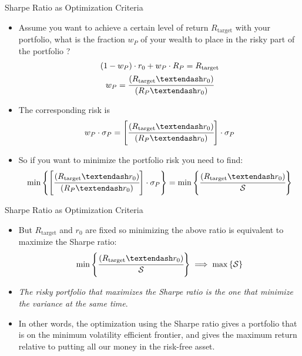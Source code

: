 \documentclass{beamer}
\begin{document}
\begin{frame}{Sharpe Ratio as Optimization Criteria}
  \begin{itemize}
    \item Assume you want to achieve a certain level of return $R_{\textrm{target}}$ with your portfolio, what is the fraction $w_P$ of your wealth to place in the risky part of the portfolio ?
      \begin{equation*}
        \begin{gathered}
          ( 1 - w_P ) \cdot r_0 + w_P \cdot R_P = R_{\textrm{target}}\\
          w_P = \cfrac{( R_{\textrm{target}} – r_0)}{( R_P – r_0)}
        \end{gathered}
      \end{equation*}
    \item The corresponding risk is
      \begin{equation*}
        w_P\cdot \sigma_P = \left[\cfrac{( R_{\textrm{target}} – r_0)}{(R_P – r_0)}\right]\cdot \sigma_P
      \end{equation*}
    \item So if you want to minimize the portfolio risk you need to find:
      \begin{equation*}
        \min\left\{\left[\cfrac{(R_{\textrm{target}} – r_0)}{(R_P – r_0)}\right]\cdot \sigma_P\right\} = \min\left\{\cfrac{( R_{\textrm{target}} – r_0)}{\mathcal{S}}\right\}
      \end{equation*}
  \end{itemize}
\end{frame}

\begin{frame}{Sharpe Ratio as Optimization Criteria}
  \begin{itemize}     
    \item But $R_{\textrm{target}}$ and $r_0$ are fixed so minimizing the above ratio is equivalent to maximize the Sharpe ratio:
      \begin{equation*}
        \min\left\{\cfrac{( R_{\textrm{target}} – r_0)}{\mathcal{S}}\right\} \implies\max\left\{\mathcal{S}\right\}
      \end{equation*}
    \item \emph{The risky portfolio that maximizes the Sharpe ratio is the one that minimize the variance at the same time}.
    \item In other words, the optimization using the Sharpe ratio gives a portfolio that is on the minimum volatility efficient frontier, and gives the maximum return relative to putting all our money in the risk-free asset.
  \end{itemize}
\end{frame}
\end{document}
